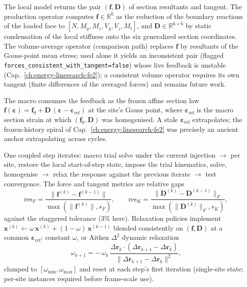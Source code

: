 \begin{definition}
The local model returns the pair $(\mathbf f, \mathbf D)$ of
section resultants and tangent. The production operator computes
$\mathbf f\in\mathbb{R}^6$ as the reduction of the boundary reactions
of the loaded face to $[N,M_y,M_z,V_y,V_z,M_t]$, and
$\mathbf D\in\mathbb{R}^{6\times6}$ by static condensation of the
local stiffness onto the six generalized section coordinates. The
volume-average operator (comparison path) replaces $\mathbf f$ by
resultants of the Gauss-point mean stress; used alone it yields an
inconsistent pair (flagged
\texttt{forces\_consistent\_with\_tangent=false}) whose live feedback
is unstable (Cap.~\ref{ch:energy-linesearch-fe2}); a consistent
volume operator requires its own tangent (finite differences of the
averaged forces) and remains future work.
\end{definition}

\begin{definition}
The macro consumes the feedback as the frozen affine section law
$\mathbf f(\bm\varepsilon) = \mathbf f_0 + \mathbf
D\,(\bm\varepsilon-\bm\varepsilon_{\mathrm{ref}})$ at the site's
Gauss point, where $\bm\varepsilon_{\mathrm{ref}}$ is the macro
section strain at which $(\mathbf f_0,\mathbf D)$ was homogenised. A
stale $\bm\varepsilon_{\mathrm{ref}}$ extrapolates; the frozen-history
spiral of Cap.~\ref{ch:energy-linesearch-fe2} was precisely an
ancient anchor extrapolating across cycles.
\end{definition}

\begin{definition}
One coupled step iterates: macro trial solve under the current
injection $\to$ per site, restore the local start-of-step state,
impose the trial kinematics, solve, homogenise $\to$ relax the
response against the previous iterate $\to$ test convergence. The
force and tangent metrics are relative gaps
\[
  \mathrm{res}_F = \frac{\lVert \mathbf f^{(k)} - \mathbf
  f^{(k-1)}\rVert}{\max(\lVert\mathbf f^{(k)}\rVert, s_F)},
  \qquad
  \mathrm{res}_K = \frac{\lVert \mathbf D^{(k)} - \mathbf
  D^{(k-1)}\rVert_F}{\max(\lVert\mathbf D^{(k)}\rVert_F, s_K)} ,
\]
against the staggered tolerance (3\% here). Relaxation policies
implement
$\mathbf x^{(k)} \leftarrow \omega\,\mathbf x^{(k)} +
(1-\omega)\,\mathbf x^{(k-1)}$ blended consistently on
$(\mathbf f,\mathbf D)$ at a common $\bm\varepsilon_{\mathrm{ref}}$:
constant $\omega$, or Aitken $\Delta^2$ dynamic relaxation
\cite{KuttlerWall2008}
\[
  \omega_{k+1} = -\,\omega_k\,
  \frac{\Delta\mathbf r_k \cdot (\Delta\mathbf r_{k+1}-\Delta\mathbf
  r_k)}{\lVert \Delta\mathbf r_{k+1}-\Delta\mathbf r_k \rVert^2},
\]
clamped to $[\omega_{\min},\omega_{\max}]$ and reset at each step's
first iteration (single-site state; per-site instances required
before frame-scale use).
\end{definition}

